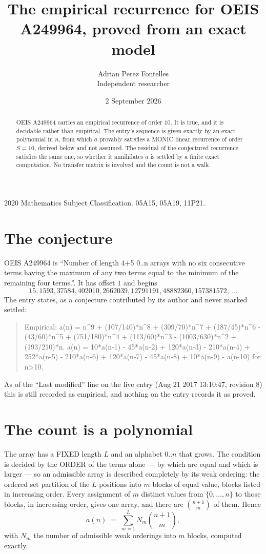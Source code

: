 \documentclass[11pt,a4paper]{article}
\title{The empirical recurrence for OEIS A249964, proved from an exact model}
\author{Adrian Perez Fontelles\\ \small Independent researcher}
\date{2 September 2026}
\theoremstyle{plain}
\theoremstyle{definition}
\begin{document}
\maketitle

\begin{abstract}
OEIS A249964 carries an empirical recurrence of order $10$. It is true, and it is
decidable rather than empirical. The entry's sequence is given exactly by an exact polynomial in $n$, from
which $a$ provably satisfies a MONIC linear recurrence of order $S=10$, derived below and not
assumed. The residual of the conjectured recurrence satisfies the same one, so whether it
annihilates $a$ is settled by a finite exact computation. No transfer matrix is involved and
the count is not a walk.
\end{abstract}

\noindent\small 2020 Mathematics Subject Classification. 05A15, 05A19, 11P21.\normalsize

\section{The conjecture}

OEIS A249964 is ``Number of length 4+5 0..n arrays with no six consecutive terms having the maximum of any two terms equal to the minimum of the remaining four terms.''. It has offset $1$ and begins
\[
15, 1593, 37584, 402010, 2662039, 12791191, 48882360, 157381572,\ \dots
\]
The entry states, as a conjecture contributed by its author and never marked settled:
\begin{quote}
Empirical: a(n) = n\^{}9 + (107/140)*n\^{}8 + (309/70)*n\^{}7 + (187/45)*n\^{}6 - (43/60)*n\^{}5 + (751/180)*n\^{}4 + (113/60)*n\^{}3 - (1003/630)*n\^{}2 + (193/210)*n. a(n) = 10*a(n-1) - 45*a(n-2) + 120*a(n-3) - 210*a(n-4) + 252*a(n-5) - 210*a(n-6) + 120*a(n-7) - 45*a(n-8) + 10*a(n-9) - a(n-10) for n>10.
\end{quote}
As of the ``Last modified'' line on the live entry (Aug 21 2017 13:10:47, revision 8)
this is still recorded as empirical, and nothing on the entry records it as proved.

\section{The count is a polynomial}

The array has a FIXED length $L$ and an alphabet $0..n$ that grows. The condition is decided by
the ORDER of the terms alone --- by which are equal and which is larger --- so an admissible
array is described completely by its weak ordering: the ordered set partition of the $L$
positions into $m$ blocks of equal value, blocks listed in increasing order. Every assignment
of $m$ distinct values from $\{0,\dots,n\}$ to those blocks, in increasing order, gives one
array, and there are $\binom{n+1}{m}$ of them. Hence
\[
a(n)\;=\;\sum_{m=1}^{L} N_m\binom{n+1}{m},
\]
with $N_m$ the number of admissible weak orderings into $m$ blocks, computed exactly.
\end{document}
